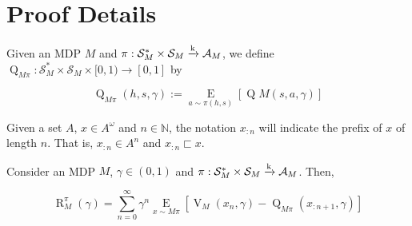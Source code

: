 \documentclass[anon,12pt]{colt2018} %
\newcommand{\AP}[1]{\left(#1\right)}
\newcommand{\AB}[1]{\left[#1\right]}
\newcommand{\Ea}[2]{\underset{#1}{\operatorname{E}}\AB{#2}}
\newcommand{\Nats}{\mathbb{N}}
\newcommand{\K}{\xrightarrow{\textnormal{k}}}
\newcommand{\A}{\mathcal{A}}
\newcommand{\St}{\mathcal{S}}
\newcommand{\V}{\operatorname{V}}
\newcommand{\Q}{\operatorname{Q}}
\newcommand{\Rg}{\operatorname{R}}
\begin{document}





\appendix

\section{Proof Details}

\begin{samepage}
\begin{definition}

Given an MDP $M$ and $\pi: \St_M^* \times \St_M \K \A_M$, we define $\Q_{M\pi}: \St_M^* \times \St_M \times [0,1) \rightarrow [0,1]$ by

\begin{equation}
\Q_{M\pi}(h,s,\gamma):=\Ea{a\sim\pi(h,s)}{\Q M(s,a,\gamma)}
\end{equation}

\end{definition}
\end{samepage}

Given a set $A$, $x\in A^\omega$ and $n\in\Nats$, the notation $x_{:n}$ will indicate the prefix of $x$ of length $n$. That is, $x_{:n} \in A^n$ and $x_{:n} \sqsubset x$.

\begin{samepage}
\begin{proposition}
\label{prp:regret_vq}

Consider an MDP $M$, $\gamma\in(0,1)$ and $\pi: \St_M^* \times \St_M \K \A_{M}$. Then,

\begin{equation}
\Rg_{M}^{\pi}(\gamma)=\sum_{n=0}^\infty {\gamma^n \Ea{x\sim M\pi}{\V_{M}\AP{x_n,\gamma}-\Q_{M\pi}\AP{x_{:n+1},\gamma}}}
\end{equation}

\end{proposition}
\end{samepage}
\end{document}
